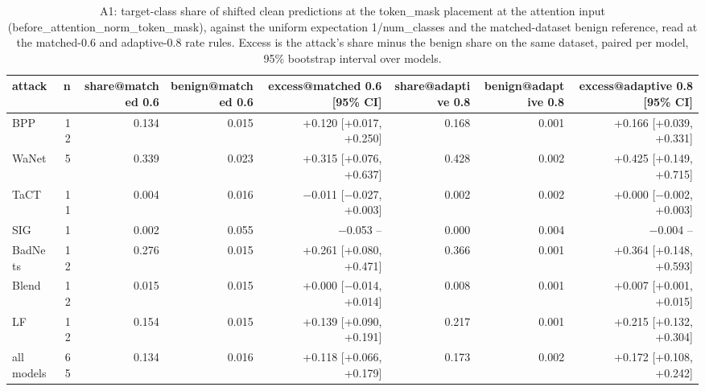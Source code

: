 \begin{table}[htbp]
\centering
\small
\caption{A1: target-class share of shifted clean predictions at the token\_mask placement at the attention input (before_attention_norm_token_mask), against the uniform expectation 1/num\_classes and the matched-dataset benign reference, read at the matched-0.6 and adaptive-0.8 rate rules. Excess is the attack's share minus the benign share on the same dataset, paired per model, 95\% bootstrap interval over models.}
\label{tab:mech-shift-target}
\begin{adjustbox}{max width=\linewidth}
\begin{tabular}{lrrrrrrr}
\toprule
attack & n & share@matched 0.6 & benign@matched 0.6 & excess@matched 0.6 [95\% CI] & share@adaptive 0.8 & benign@adaptive 0.8 & excess@adaptive 0.8 [95\% CI] \\
\midrule
BPP & 12 & 0.134 & 0.015 & +0.120 [+0.017, +0.250] & 0.168 & 0.001 & +0.166 [+0.039, +0.331] \\
WaNet & 5 & 0.339 & 0.023 & +0.315 [+0.076, +0.637] & 0.428 & 0.002 & +0.425 [+0.149, +0.715] \\
TaCT & 11 & 0.004 & 0.016 & $-$0.011 [$-$0.027, +0.003] & 0.002 & 0.002 & +0.000 [$-$0.002, +0.003] \\
SIG & 1 & 0.002 & 0.055 & $-$0.053 -- & 0.000 & 0.004 & $-$0.004 -- \\
BadNets & 12 & 0.276 & 0.015 & +0.261 [+0.080, +0.471] & 0.366 & 0.001 & +0.364 [+0.148, +0.593] \\
Blend & 12 & 0.015 & 0.015 & +0.000 [$-$0.014, +0.014] & 0.008 & 0.001 & +0.007 [+0.001, +0.015] \\
LF & 12 & 0.154 & 0.015 & +0.139 [+0.090, +0.191] & 0.217 & 0.001 & +0.215 [+0.132, +0.304] \\
all models & 65 & 0.134 & 0.016 & +0.118 [+0.066, +0.179] & 0.173 & 0.002 & +0.172 [+0.108, +0.242] \\
\bottomrule
\end{tabular}
\end{adjustbox}
\end{table}

